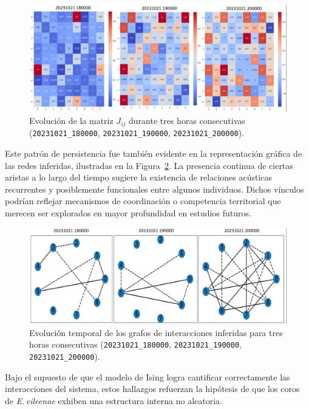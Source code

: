 \begin{figure}[ht]
    \centering
    \includegraphics[width=\columnwidth]{Graphics/3_matrixs.jpg}
    \caption{Evolución de la matriz \( J_{ij} \) durante tres horas consecutivas (\texttt{20231021\_180000}, \texttt{20231021\_190000}, \texttt{20231021\_200000}).}
    \label{fig:jij_evol}
\end{figure}

Este patrón de persistencia fue también evidente en la 
representación gráfica de las redes inferidas, ilustradas en la 
Figura~\ref{fig:graph_evol}. La presencia continua de ciertas 
aristas a lo largo del tiempo sugiere la existencia de 
relaciones acústicas recurrentes y posiblemente funcionales 
entre algunos individuos. Dichos vínculos podrían reflejar 
mecanismos de coordinación o competencia territorial que 
merecen ser explorados en mayor profundidad en estudios futuros.

\begin{figure}[ht]
    \centering
    \includegraphics[width=\columnwidth]{Graphics/3_graphs.jpg}
    \caption{Evolución temporal de los grafos de interacciones inferidas para tres horas consecutivas (\texttt{20231021\_180000}, \texttt{20231021\_190000}, \texttt{20231021\_200000}).}
    \label{fig:graph_evol}
\end{figure}

Bajo el supuesto de que el modelo de Ising logra cantificar correctamente
las interacciones del sistema, estos hallazgos refuerzan la hipótesis de 
que los coros de 
\emph{E.\,eileenae} exhiben una estructura interna no aleatoria.


